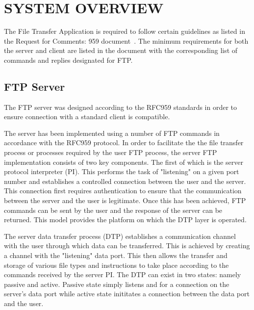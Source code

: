 \documentclass[10pt, conference]{IEEEtran}
\begin{document}
%
\section{SYSTEM OVERVIEW}
\label{sec: System Overview}
The File Transfer Application is required to follow certain guidelines as listed in the Request for Comments: 959 document~\cite{RFC959}. The minimum requirements for both the server and client are listed in the document with the corresponding list of commands and replies designated for FTP.

\subsection{FTP Server}
\label{sec: FTP Server}
The FTP server was designed according to the RFC959 standards in order to ensure connection with a standard client is compatible\cite{RFC959}.

The server has been implemented using a number of FTP commands in accordance with the RFC959 protocol. In order to facilitate the the file transfer process or processes required by the user FTP process, the server FTP implementation consists of two key components. The first of which is the server protocol interpreter (PI). This performs the task of "listening" on a given port number and establishes a controlled connection between the user and the server. This connection first requires authentication to ensure that the communication between the server and the user is legitimate. Once this has been achieved, FTP commands can be sent by the user and the response of the server can be returned. This model provides the platform on which the DTP layer is operated\cite{FTP}.

The server data transfer process (DTP) establishes a communication channel with the user through which data can be transferred. This is achieved by creating a channel with the "listening" data port. This then allows the transfer and storage of various file types and instructions to take place according to the commands received by the server PI. The DTP can exist in two states: namely passive and active. Passive state simply listens and for a connection on the server's data port while active state inititates a connection between the data port and the user.
\end{document}
